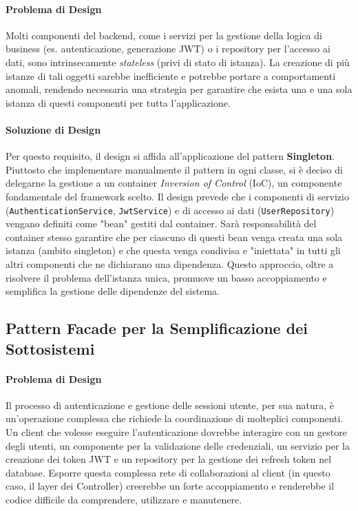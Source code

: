 \documentclass[12pt,a4paper,openright,twoside]{book}
\begin{document}
\paragraph{Problema di Design}
Molti componenti del backend, come i servizi per la gestione della logica di business (es. autenticazione, generazione JWT) o i repository per l'accesso ai dati, sono intrinsecamente \textit{stateless} (privi di stato di istanza). La creazione di più istanze di tali oggetti sarebbe inefficiente e potrebbe portare a comportamenti anomali, rendendo necessaria una strategia per garantire che esista una e una sola istanza di questi componenti per tutta l'applicazione.

\paragraph{Soluzione di Design}
Per questo requisito, il design si affida all'applicazione del pattern \textbf{Singleton}. Piuttosto che implementare manualmente il pattern in ogni classe, si è deciso di delegarne la gestione a un container \textit{Inversion of Control} (IoC), un componente fondamentale del framework scelto. Il design prevede che i componenti di servizio (\texttt{AuthenticationService}, \texttt{JwtService}) e di accesso ai dati (\texttt{UserRepository}) vengano definiti come "bean" gestiti dal container. Sarà responsabilità del container stesso garantire che per ciascuno di questi bean venga creata una sola istanza (ambito singleton) e che questa venga condivisa e "iniettata" in tutti gli altri componenti che ne dichiarano una dipendenza. Questo approccio, oltre a risolvere il problema dell'istanza unica, promuove un basso accoppiamento e semplifica la gestione delle dipendenze del sistema.

\subsection{Pattern Facade per la Semplificazione dei Sottosistemi}
\label{subsec:design_facade}

\paragraph{Problema di Design}
Il processo di autenticazione e gestione delle sessioni utente, per sua natura, è un'operazione complessa che richiede la coordinazione di molteplici componenti. Un client che volesse eseguire l'autenticazione dovrebbe interagire con un gestore degli utenti, un componente per la validazione delle credenziali, un servizio per la creazione dei token JWT e un repository per la gestione dei refresh token nel database. Esporre questa complessa rete di collaborazioni al client (in questo caso, il layer dei Controller) creerebbe un forte accoppiamento e renderebbe il codice difficile da comprendere, utilizzare e manutenere.
\end{document}
